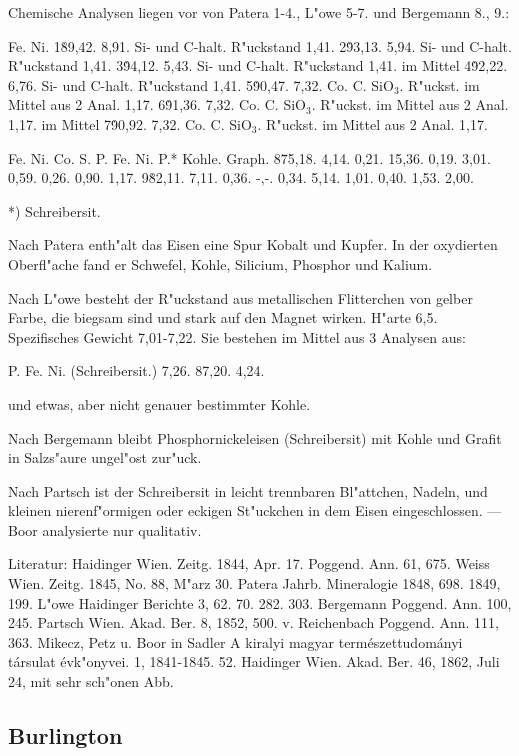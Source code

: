 \documentclass[a4paper, 11pt, oneside]{article}
\begin{document}
Chemische Analysen liegen vor von Patera 1-4., L"owe 5-7. und Bergemann 8., 9.:

Fe. Ni.  
1\. 89,42. 8,91. Si- und C-halt. R"uckstand 1,41.  
2\. 93,13. 5,94. Si- und C-halt. R"uckstand 1,41.  
3\. 94,12. 5,43.  Si- und C-halt. R"uckstand 1,41.  
im Mittel 4\. 92,22. 6,76. Si- und C-halt. R"uckstand 1,41.  
5\. 90,47. 7,32. Co. C. SiO$_{3}$. R"uckst. im Mittel aus 2 Anal. 1,17.  
6\. 91,36. 7,32. Co. C. SiO$_{3}$. R"uckst. im Mittel aus 2 Anal. 1,17.  
im Mittel 7\. 90,92. 7,32. Co. C. SiO$_{3}$. R"uckst. im Mittel aus 2 Anal. 1,17.  

Fe. Ni. Co. S. P. {Fe. Ni. P.}* Kohle. Graph.  
8\. 75,18. 4,14. 0,21. 15,36. 0,19. 3,01. 0,59. 0,26. 0,90. 1,17.  
9\. 82,11. 7,11. 0,36. -,-. 0,34. 5,14. 1,01. 0,40. 1,53. 2,00.

*) Schreibersit.

Nach Patera enth"alt das Eisen eine Spur Kobalt und Kupfer. In der oxydierten Oberfl"ache fand er Schwefel, Kohle, Silicium, Phosphor und Kalium.

Nach L"owe besteht der R"uckstand aus metallischen Flitterchen von gelber Farbe, die biegsam sind und stark auf den Magnet wirken. H"arte 6,5. Spezifisches Gewicht 7,01-7,22. Sie bestehen im Mittel aus 3 Analysen aus:

P. Fe. Ni. (Schreibersit.)  
7,26. 87,20. 4,24.

und etwas, aber nicht genauer bestimmter Kohle.

Nach Bergemann bleibt Phosphornickeleisen (Schreibersit) mit Kohle und Grafit in Salzs"aure ungel"ost zur"uck.

Nach Partsch ist der Schreibersit in leicht trennbaren Bl"attchen, Nadeln, und kleinen nierenf"ormigen oder eckigen St"uckchen in dem Eisen eingeschlossen. --- Boor analysierte nur qualitativ.

Literatur: Haidinger Wien. Zeitg. 1844, Apr. 17. Poggend. Ann. 61, 675. Weiss Wien. Zeitg. 1845, No. 88, M"arz 30. Patera Jahrb. Mineralogie 1848, 698. 1849, 199. L"owe Haidinger Berichte 3, 62. 70. 282. 303. Bergemann Poggend. Ann. 100, 245. Partsch Wien. Akad. Ber. 8, 1852, 500. v. Reichenbach Poggend. Ann. 111, 363. Mikecz, Petz u. Boor in Sadler A kiralyi magyar természettudományi társulat évk"onyvei. 1, 1841-1845. 52. Haidinger Wien. Akad. Ber. 46, 1862, Juli 24, mit sehr sch"onen Abb.

\subsection{Burlington}
\normalsize
\end{document}
